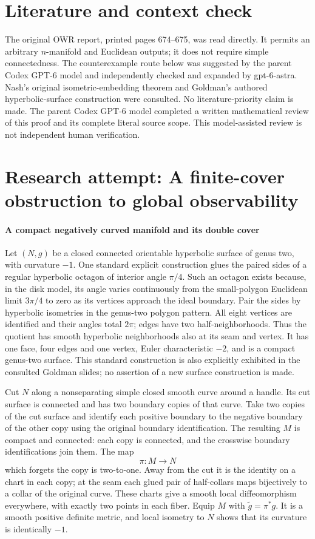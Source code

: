 \documentclass[11pt]{article}
\begin{document}
\section{Literature and context check}
The original OWR report, printed pages 674--675, was read directly. It permits an arbitrary $n$-manifold and Euclidean outputs; it does not require simple connectedness. The counterexample route below was suggested by the parent Codex GPT-6 model and independently checked and expanded by gpt-6-astra. Nash's original isometric-embedding theorem and Goldman's authored hyperbolic-surface construction were consulted. No literature-priority claim is made. The parent Codex GPT-6 model completed a written mathematical review of this proof and its complete literal source scope. This model-assisted review is not independent human verification.
\section{Research attempt: A finite-cover obstruction to global observability}

\paragraph{A compact negatively curved manifold and its double cover}
Let $(N,g)$ be a closed connected orientable hyperbolic surface of genus two, with curvature $-1$. One standard explicit construction glues the paired sides of a regular hyperbolic octagon of interior angle $\pi/4$. Such an octagon exists because, in the disk model, its angle varies continuously from the small-polygon Euclidean limit $3\pi/4$ to zero as its vertices approach the ideal boundary. Pair the sides by hyperbolic isometries in the genus-two polygon pattern. All eight vertices are identified and their angles total $2\pi$; edges have two half-neighborhoods. Thus the quotient has smooth hyperbolic neighborhoods also at its seam and vertex. It has one face, four edges and one vertex, Euler characteristic $-2$, and is a compact genus-two surface. This standard construction is also explicitly exhibited in the consulted Goldman slides; no assertion of a new surface construction is made.

Cut $N$ along a nonseparating simple closed smooth curve around a handle. Its cut surface is connected and has two boundary copies of that curve. Take two copies of the cut surface and identify each positive boundary to the negative boundary of the other copy using the original boundary identification. The resulting $M$ is compact and connected: each copy is connected, and the crosswise boundary identifications join them. The map
\[
 \pi:M\longrightarrow N
\]
which forgets the copy is two-to-one. Away from the cut it is the identity on a chart in each copy; at the seam each glued pair of half-collars maps bijectively to a collar of the original curve. These charts give a smooth local diffeomorphism everywhere, with exactly two points in each fiber. Equip $M$ with $\widetilde g=\pi^*g$. It is a smooth positive definite metric, and local isometry to $N$ shows that its curvature is identically $-1$.
\end{document}
